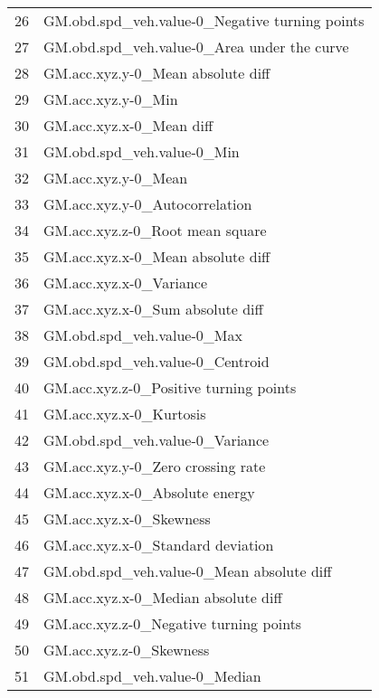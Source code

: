 \begin{tabular}{ll}
26  &    GM.obd.spd\_veh.value-0\_Negative turning points \\
27  &       GM.obd.spd\_veh.value-0\_Area under the curve \\
28  &                 GM.acc.xyz.y-0\_Mean absolute diff \\
29  &                                GM.acc.xyz.y-0\_Min \\
30  &                          GM.acc.xyz.x-0\_Mean diff \\
31  &                        GM.obd.spd\_veh.value-0\_Min \\
32  &                               GM.acc.xyz.y-0\_Mean \\
33  &                    GM.acc.xyz.y-0\_Autocorrelation \\
34  &                   GM.acc.xyz.z-0\_Root mean square \\
35  &                 GM.acc.xyz.x-0\_Mean absolute diff \\
36  &                           GM.acc.xyz.x-0\_Variance \\
37  &                  GM.acc.xyz.x-0\_Sum absolute diff \\
38  &                        GM.obd.spd\_veh.value-0\_Max \\
39  &                   GM.obd.spd\_veh.value-0\_Centroid \\
40  &            GM.acc.xyz.z-0\_Positive turning points \\
41  &                           GM.acc.xyz.x-0\_Kurtosis \\
42  &                   GM.obd.spd\_veh.value-0\_Variance \\
43  &                 GM.acc.xyz.y-0\_Zero crossing rate \\
44  &                    GM.acc.xyz.x-0\_Absolute energy \\
45  &                           GM.acc.xyz.x-0\_Skewness \\
46  &                 GM.acc.xyz.x-0\_Standard deviation \\
47  &         GM.obd.spd\_veh.value-0\_Mean absolute diff \\
48  &               GM.acc.xyz.x-0\_Median absolute diff \\
49  &            GM.acc.xyz.z-0\_Negative turning points \\
50  &                           GM.acc.xyz.z-0\_Skewness \\
51  &                     GM.obd.spd\_veh.value-0\_Median \\

\end{tabular}

